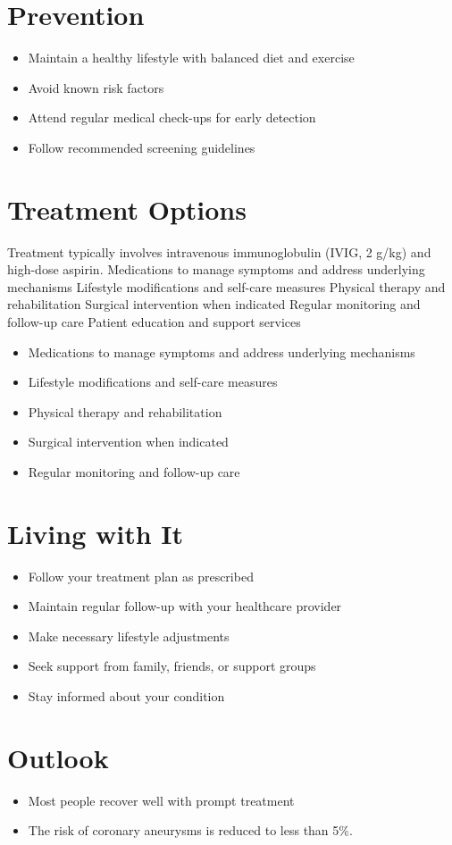 \section{Prevention}
\begin{itemize}[noitemsep]
  \item Maintain a healthy lifestyle with balanced diet and exercise
  \item Avoid known risk factors
  \item Attend regular medical check-ups for early detection
  \item Follow recommended screening guidelines
\end{itemize}
\section{Treatment Options}
Treatment typically involves intravenous immunoglobulin (IVIG, 2 g/kg) and high-dose aspirin. Medications to manage symptoms and address underlying mechanisms Lifestyle modifications and self-care measures Physical therapy and rehabilitation Surgical intervention when indicated Regular monitoring and follow-up care Patient education and support services

\begin{itemize}[noitemsep]
  \item Medications to manage symptoms and address underlying mechanisms
  \item Lifestyle modifications and self-care measures
  \item Physical therapy and rehabilitation
  \item Surgical intervention when indicated
  \item Regular monitoring and follow-up care
\end{itemize}
\section{Living with It}
\begin{itemize}[noitemsep]
  \item Follow your treatment plan as prescribed
  \item Maintain regular follow-up with your healthcare provider
  \item Make necessary lifestyle adjustments
  \item Seek support from family, friends, or support groups
  \item Stay informed about your condition
\end{itemize}
\section{Outlook}
\begin{itemize}[noitemsep]
  \item Most people recover well with prompt treatment
  \item The risk of coronary aneurysms is reduced to less than 5\%.
\end{itemize}

